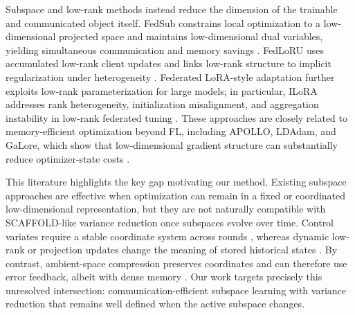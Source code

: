 \documentclass[11pt]{article}
\begin{document}
Subspace and low-rank methods instead reduce the dimension of the trainable and communicated object itself. FedSub constrains local optimization to a low-dimensional projected space and maintains low-dimensional dual variables, yielding simultaneous communication and memory savings \citep{zhang2025efficient}. FedLoRU uses accumulated low-rank client updates and links low-rank structure to implicit regularization under heterogeneity \citep{Park2024CommunicationEfficientFL}. Federated LoRA-style adaptation further exploits low-rank parameterization for large models; in particular, ILoRA addresses rank heterogeneity, initialization misalignment, and aggregation instability in low-rank federated tuning \citep{Zhou2025ILoRAFL}. These approaches are closely related to memory-efficient optimization beyond FL, including APOLLO, LDAdam, and GaLore, which show that low-dimensional gradient structure can substantially reduce optimizer-state costs \citep{zhu2024apollo, Robert2024LDAdamAO, Zhao2024GaLoreML}.

This literature highlights the key gap motivating our method. Existing subspace approaches are effective when optimization can remain in a fixed or coordinated low-dimensional representation, but they are not naturally compatible with SCAFFOLD-like variance reduction once subspaces evolve over time. Control variates require a stable coordinate system across rounds \citep{karimireddy2020scaffold}, whereas dynamic low-rank or projection updates change the meaning of stored historical states \citep{Robert2024LDAdamAO, Zhao2024GaLoreML, Zhou2025ILoRAFL}. By contrast, ambient-space compression preserves coordinates and can therefore use error feedback, albeit with dense memory \citep{Richtarik2021EF21AN, Huang2023StochasticCA}. Our work targets precisely this unresolved intersection: communication-efficient subspace learning with variance reduction that remains well defined when the active subspace changes.



\end{document}
